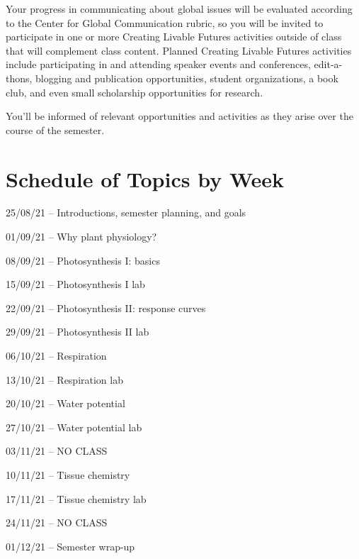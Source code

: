\documentclass[12pt, notitlepage]{article}   	%
\begin{document}
{Your progress in communicating about global issues will be evaluated according to the 
Center for Global Communication rubric, so you will be invited to participate 
in one or more Creating Livable Futures activities outside of class that will 
complement class content. 
Planned Creating Livable Futures activities include participating in and attending 
speaker events and conferences, edit-a-thons, blogging and publication opportunities, 
student organizations, a book club, and even small scholarship opportunities for research. 

You’ll be informed of relevant opportunities and activities as they arise over 
the course of the semester.

\newpage

\section*{Schedule of Topics by Week}
25/08/21 – Introductions, semester planning, and goals \par
01/09/21 – Why plant physiology? \par
08/09/21 – Photosynthesis I: basics \par
15/09/21 – Photosynthesis I lab \par
22/09/21 – Photosynthesis II: response curves \par
29/09/21 – Photosynthesis II lab \par
06/10/21 – Respiration \par
13/10/21 – Respiration lab \par
20/10/21 – Water potential \par
27/10/21 – Water potential lab \par
03/11/21 – NO CLASS \par
10/11/21 – Tissue chemistry \par
17/11/21 – Tissue chemistry lab \par
24/11/21 – NO CLASS \par
01/12/21 – Semester wrap-up \par

} %
\end{document}
